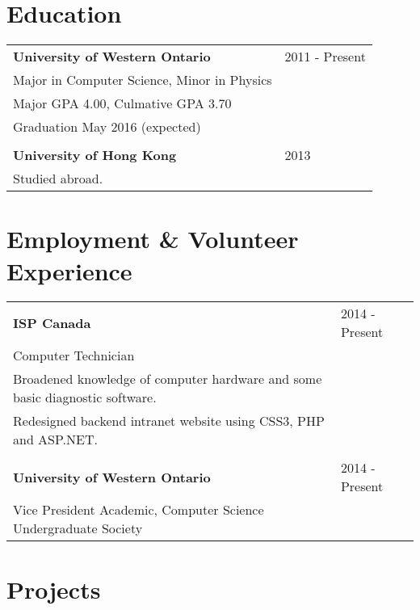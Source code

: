 \documentclass{article}
\def \resumeitem {\bf}
\def \resumedate {}
\def \resumedetails {\small}
\begin{document}
\begin{minipage}[t]{0.7\hsize} %
	
	\section{Education}
	
		\begin{tabular}{p{}p{}}
			\resumeitem{University of Western Ontario} & \resumedate{2011 - Present}\\
			Major in Computer Science, Minor in Physics &\\
			\resumedetails{Major GPA 4.00, Culmative GPA 3.70} &\\
			\resumedetails{Graduation May 2016 (expected)} &\\
			\\
			\resumeitem{University of Hong Kong} & \resumedate{2013}\\
			Studied abroad. &
		\end{tabular}
		
	\vspace{7mm}
	
	\section{Employment \& Volunteer Experience}
	
		\begin{tabular}{p{}p{}}
			\resumeitem{ISP Canada} & \resumedate{2014 - Present}\\
			Computer Technician &\\
			\resumedetails{Broadened knowledge of computer hardware and some basic diagnostic software.} &\\
			\resumedetails{Redesigned backend intranet website using CSS3, PHP and ASP.NET.} &\\
			&\\
			\resumeitem{University of Western Ontario} & \resumedate{2014 - Present}\\
			Vice President Academic, Computer Science Undergraduate Society &\\
		\end{tabular}
	
	\vspace{7mm}
	
	\section{Projects}
	

\end{minipage}
\end{document}
